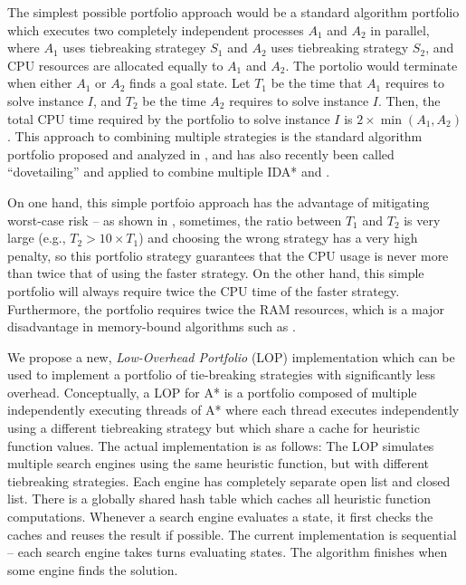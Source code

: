 The simplest possible portfolio approach would be a standard algorithm portfolio
which executes two completely independent \astar processes $A_1$ and $A_2$ in parallel, where $A_1$ uses tiebreaking strategey $S_1$ and $A_2$ uses tiebreaking strategy $S_2$, and CPU resources are allocated equally to $A_1$ and $A_2$.
The portolio would terminate when either $A_1$ or $A_2$ finds a goal state.
Let $T_1$ be the time that $A_1$ requires to solve instance $I$, and $T_2$ be the
time $A_2$ requires to solve instance $I$. Then, the total CPU time
required by the portfolio to solve instance $I$ is $2\times\min(A_1,A_2)$. This approach to combining multiple strategies is the standard algorithm portfolio proposed and analyzed in \cite{HubermanLH97,GomesS01}, and has also recently been called ``dovetailing'' and applied to combine multiple IDA* and \astar  \cite{ValenzanoSSBK10}. %

On one hand, this simple portfoio approach has the advantage of mitigating worst-case risk -- as shown in , sometimes, the ratio between $T_1$ and $T_2$ is very large (e.g., $T_2 > 10\times T_1$) and choosing the wrong strategy has a very high penalty, so this portfolio strategy guarantees that the CPU usage is never more than twice that of using the faster strategy.
On the other hand, this simple portfolio will always require twice the CPU time of the faster strategy. Furthermore, the portfolio requires twice the RAM resources, which is a major disadvantage in memory-bound algorithms such as \astar.

We propose a new, \emph{Low-Overhead Portfolio} (LOP) implementation which can be used to implement a portfolio of tie-breaking strategies with significantly less overhead.
Conceptually, a LOP for A* is a portfolio composed of multiple independently executing threads of A*  where each thread  executes independently using a different tiebreaking strategy but which share a cache for heuristic function values.
The actual implementation is as follows:
The LOP simulates
multiple search engines using the same heuristic function, but with
different tiebreaking strategies.  Each engine has completely separate
open list and closed list.  There is a globally shared hash
table which caches all heuristic function computations.  Whenever a
search engine evaluates a state, it first checks the caches and 
reuses the result if possible.  The current implementation is sequential -- each search engine takes  turns 
evaluating states. The algorithm finishes when some engine finds the solution.


